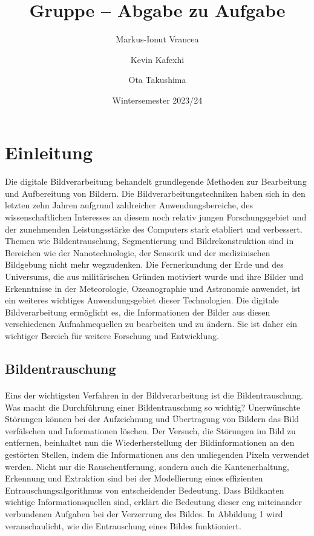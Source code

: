 \documentclass[course=erap]{aspdoc}
\author{Markus-Ionut Vrancea \and Kevin Kafexhi \and Ota Takushima}
\date{Wintersemester 2023/24} %
\title{Gruppe \theGroup{} -- Abgabe zu Aufgabe \theNumber}
\begin{document}
\maketitle
\section{Einleitung}
\paragraph{}
Die digitale Bildverarbeitung behandelt grundlegende Methoden zur Bearbeitung und Aufbereitung von Bildern. 
Die Bildverarbeitungstechniken haben sich in den letzten zehn Jahren aufgrund zahlreicher Anwendungsbereiche, 
des wissenschaftlichen Interesses an diesem noch relativ jungen Forschungsgebiet und der zunehmenden Leistungsstärke 
des Computers stark etabliert und verbessert. Themen wie Bildentrauschung, Segmentierung und Bildrekonstruktion sind in Bereichen 
wie der Nanotechnologie, der Sensorik und der medizinischen Bildgebung nicht mehr wegzudenken. Die Fernerkundung der Erde und 
des Universums, die aus militärischen Gründen motiviert wurde und ihre Bilder und Erkenntnisse in der Meteorologie, 
Ozeanographie und Astronomie anwendet, ist ein weiteres wichtiges Anwendungsgebiet dieser Technologien.
Die digitale Bildverarbeitung ermöglicht es, die Informationen der Bilder aus diesen verschiedenen Aufnahmequellen zu bearbeiten und zu ändern.
Sie ist daher ein wichtiger Bereich für weitere Forschung und Entwicklung.

\subsection{Bildentrauschung}
\paragraph{}
Eins der wichtigsten Verfahren in der Bildverarbeitung ist die Bildentrauschung. Was macht die Durchführung einer 
Bildentrauschung so wichtig? Unerwünschte Störungen können bei der Aufzeichnung und Übertragung von Bildern das Bild
verfälschen und Informationen löschen. Der Versuch, die Störungen im Bild zu entfernen, beinhaltet nun die Wiederherstellung 
der Bildinformationen an den gestörten Stellen, indem die Informationen aus den umliegenden Pixeln verwendet werden. 
Nicht nur die Rauschentfernung, sondern auch die Kantenerhaltung, Erkennung und Extraktion sind bei der Modellierung 
eines effizienten Entrauschungsalgorithmus von entscheidender Bedeutung. Dass Bildkanten wichtige Informationsquellen 
sind, erklärt die Bedeutung dieser eng miteinander verbundenen Aufgaben bei der Verzerrung des Bildes.
In Abbildung 1 wird veranschaulicht, wie die Entrauschung eines Bildes funktioniert.
\end{document}
